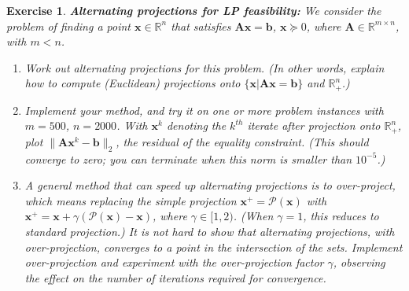 \documentclass[12pt]{article}
\theoremstyle{colon}
\newtheorem{exercise}{Exercise}
\begin{document}
\begin{exercise}
	\textbf{Alternating projections for LP feasibility:} We consider the problem of finding a point $\bm{x} \in \mathbb{R}^n$ that satisfies $\bm{A} \bm{x} = \bm{b}$, $\bm{x} \succeq 0$, where $\bm{A} \in \mathbb{R}^{m \times n}$, with $m < n$.

	\begin{enumerate}[label=\alph*)]
		\item Work out alternating projections for this problem. (In other words, explain how to compute (Euclidean) projections onto $\{\bm{x} | \bm{A} \bm{x} = \bm{b} \}$ and $\mathbb{R}_+^n$.)
		\item Implement your method, and try it on one or more problem instances with $m = 500$, $n = 2000$. With $\bm{x}^k$ denoting the $k^{th}$ iterate after projection onto $\mathbb{R}_+^n$, plot $\lVert \bm{A} \bm{x}^k - \bm{b} \rVert_2$, the residual of the equality constraint. (This should converge to zero; you can terminate when this norm is smaller than $10^{-5}$.)
		\item A general method that can speed up alternating projections is to over-project, which means replacing the simple projection $\bm{x}^+ = \mathcal{P}(\bm{x})$ with $\bm{x}^+ = \bm{x} + \gamma(\mathcal{P}(\bm{x}) - \bm{x})$, where $\gamma \in [1,2)$. (When $\gamma = 1$, this reduces to standard projection.) It is not hard to show that alternating projections, with over-projection, converges to a point in the intersection of the sets. Implement over-projection and experiment with the over-projection factor $\gamma$, observing the effect on the number of iterations required for convergence.
	\end{enumerate}

\end{exercise}
\end{document}
